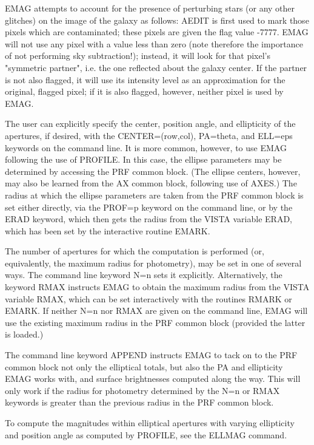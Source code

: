 EMAG attempts to account for the presence of perturbing stars (or any other
glitches) on the image of the galaxy as follows: AEDIT is first used to
mark those pixels which are contaminated; these pixels are given the flag
value -7777. EMAG will not use any pixel with a value less than zero (note
therefore the importance of not performing sky subtraction!); instead, it
will look for that pixel's "symmetric partner", i.e. the one reflected
about the galaxy center. If the partner is not also flagged, it will use
its intensity level as an approximation for the original, flagged pixel; if
it is also flagged, however, neither pixel is used by EMAG.

The user can explicitly specify the center, position angle, and ellipticity
of the apertures, if desired, with the CENTER=(row,col), PA=theta, and
ELL=eps keywords on the command line. It is more common, however, to use
EMAG following the use of PROFILE. In this case, the ellipse parameters may
be determined by accessing the PRF common block. (The ellipse centers,
however, may also be learned from the AX common block, following use of
AXES.) The radius at which the ellipse parameters are taken from the PRF
common block is set either directly, via the PROF=p keyword on the command
line, or by the ERAD keyword, which then gets the radius from the VISTA
variable ERAD, which has been set by the interactive routine EMARK.

The number of apertures for which the computation is performed (or,
equivalently, the maximum radius for photometry), may be set in one of
several ways. The command line keyword N=n sets it explicitly.
Alternatively, the keyword RMAX instructs EMAG to obtain the maximum radius
from the VISTA variable RMAX, which can be set interactively with the
routines RMARK or EMARK. If neither N=n nor RMAX are given on the command
line, EMAG will use the existing maximum radius in the PRF common block
(provided the latter is loaded.)

The command line keyword APPEND instructs EMAG to tack on to the PRF common
block not only the elliptical totals, but also the PA and ellipticity EMAG
works with, and surface brightnesses computed along the way. This will only
work if the radius for photometry determined by the N=n or RMAX keywords is
greater than the previous radius in the PRF common block.

To compute the magnitudes within elliptical apertures with varying
ellipticity and position angle as computed by PROFILE, see the ELLMAG
command.


